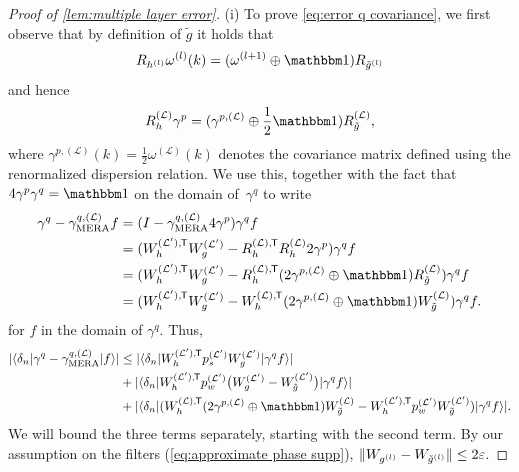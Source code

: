 \documentclass[submission, Phys]{SciPost}
\theoremstyle{definition}
\theoremstyle{remark}
\DeclareMathOperator{\mera}{MERA}
\DeclarePairedDelimiter{\abs}{\lvert}{\rvert}
\DeclarePairedDelimiter{\norm}{\lVert}{\rVert}
\DeclarePairedDelimiter{\braket}{\langle}{\rangle}
\newcommand{\op}{\oplus}
\newcommand{\eps}{\varepsilon}
\newcommand{\id}{\mathbbm 1}
\newcommand{\cL}{\mathcal L}
\newcommand*{\tran}{{\mkern-1.5mu\mathsf{T}}}
\begin{document}
\begin{appendix}
\begin{proof}[Proof of \cref{lem:multiple layer error}]
(i) To prove \cref{eq:error q covariance}, we first observe that by definition of $\tilde{g}$ it holds that
\begin{equation*}
  R_{h^{(l)}} \omega^{(l)}(k) = (\omega^{(l+1)} \op \id) R_{\tilde g^{(l)}}
\end{equation*}
and hence
\begin{equation}\label{eq:Rh vs Rgtilde}
  R^{(\cL)}_h \gamma^p = (\gamma^{p,(\cL)} \op \frac12\id) R^{(\cL)}_{\tilde g},
\end{equation}
where $\gamma^{p,(\cL)}(k) = \frac12 \omega^{(\cL)}(k)$ denotes the covariance matrix defined using the renormalized dispersion relation.
We use this, together with the fact that $4\gamma^p \gamma^q = \id$ on the domain of~$\gamma^q$ to write
\begin{equation*}\begin{aligned}
  \gamma^q - \gamma^{q,(\cL)}_{\mera} f
&= (I - \gamma^{q,(\cL)}_{\mera} 4 \gamma^p) \gamma^q f \\
&= (W_h^{(\cL'),\tran}W_g^{(\cL')} - R_h^{(\cL),\tran}R_h^{(\cL)} 2\gamma^p) \gamma^q f \\
&= (W_h^{(\cL'),\tran}W_g^{(\cL')} - R_h^{(\cL),\tran}(2\gamma^{p,(\cL)} \op \id) R^{(\cL)}_{\tilde g}) \gamma^q f \\
&= (W_h^{(\cL'),\tran}W_g^{(\cL')} - W_h^{(\cL),\tran}(2\gamma^{p,(\cL)} \op \id) W^{(\cL)}_{\tilde g}) \gamma^q f.
\end{aligned}\end{equation*}
for $f$ in the domain of $\gamma^q$.
Thus,
\begin{equation}\begin{aligned}\label{eq:estimate covariance}
  \abs{\braket{\delta_n | \gamma^q - \gamma^{q,(\cL)}_{\mera} | f}}
&\leq \abs{\braket{\delta_n | W_h^{(\cL'),\tran} p^{(\cL')}_s W_g^{(\cL')} | \gamma^q f}} \\
&+ \abs{\braket{\delta_n | W_h^{(\cL'),\tran} p^{(\cL')}_w \bigl(W_g^{(\cL')} - W_{\tilde{g}}^{(\cL')}\bigr) | \gamma^q f}} \\
&+ \abs{\braket{\delta_n | (W_h^{(\cL),\tran}(2\gamma^{p,(\cL)} \op \id) W_{\tilde{g}}^{(\cL)} - W_h^{(\cL'),\tran} p^{(\cL')}_w W_{\tilde{g}}^{(\cL')}) | \gamma^q f}}.
\end{aligned}\end{equation}
We will bound the three terms separately, starting with the second term.
By our assumption on the filters (\cref{eq:approximate phase supp}), $\norm{W_{g^{(l)}} - W_{\tilde{g}^{(l)}}} \leq 2\eps$.

\end{proof}
\end{appendix}
\end{document}
